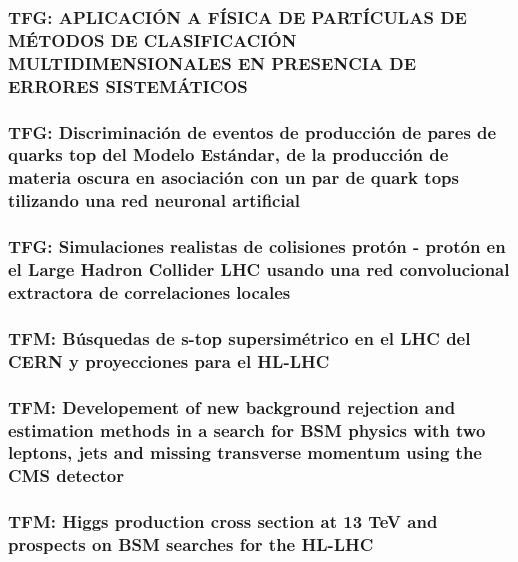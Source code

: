 \documentclass[a4paper, 11pt, twoside, openright]{report}
\begin{document}
\subsubsection{TFG: APLICACIÓN A FÍSICA DE PARTÍCULAS DE MÉTODOS DE CLASIFICACIÓN MULTIDIMENSIONALES EN PRESENCIA DE ERRORES SISTEMÁTICOS}


\subsubsection{TFG: Discriminación de eventos de producción de pares de quarks top del Modelo Estándar, de la producción de materia oscura en asociación con un par de quark tops tilizando una red neuronal artificial}


\subsubsection{TFG: Simulaciones realistas de colisiones protón - protón en el Large Hadron Collider LHC usando una red convolucional extractora de correlaciones locales}


\subsubsection{TFM: Búsquedas de s-top supersimétrico en el LHC del CERN y proyecciones para el HL-LHC}


\subsubsection{TFM: Developement of new background rejection and estimation methods in a search for BSM physics with two leptons, jets and missing transverse momentum using the CMS detector}


\subsubsection{TFM: Higgs production cross section at 13 TeV and prospects on BSM searches for the HL-LHC}

\end{document}
